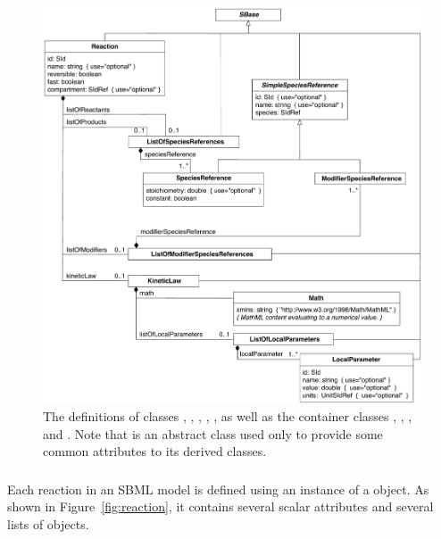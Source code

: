 \begin{figure}[htb]
  \centering
  \vspace*{2ex}
  \includegraphics[scale=0.8]{figs/reaction-uml-v2}
  \vspace*{0.5ex}
  \caption{The definitions of classes \Reaction, \KineticLaw,
      \SpeciesReference, \ModifierSpeciesReference, \LocalParameter,
      as well as the
      container classes \ListOfReactants, \ListOfProducts,
      \ListOfModifiers, and \ListOfLocalParameters.  Note that
      \SimpleSpeciesReference is an abstract class used only to
      provide some common attributes to its derived classes.}
  \label{fig:reaction}
\end{figure}


\subsubsection{}
\label{sec:reaction-type}
\label{sec:listofreactants}
\label{sec:listofproducts}
\label{sec:listofmodifiers}

Each reaction in an SBML model is defined using an instance of a
\Reaction object.  As shown in Figure~\vref{fig:reaction}, it
contains several scalar attributes and several lists of objects.


